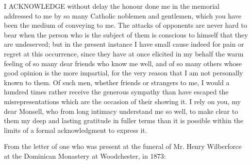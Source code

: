I ACKNOWLEDGE without delay
the honour done me in the memorial addressed to me by so many Catholic
noblemen and gentlemen, which you have been the medium of conveying to
me. The attacks of opponents are never hard to bear when the person
who is the subject of them is conscious to himself that they are
undeserved; but in the present instance I have small cause indeed for
pain or regret at this occurrence, since they have at once elicited in
my behalf the warm feeling of so many dear friends who know me well,
and of so many others whose good opinion is the more impartial, for
the very reason that I am not personally known to them. Of such men,
whether friends or strangers to me, I would a hundred times rather
receive the generous sympathy than have escaped the misrepresentations
which are the occasion of their showing it. I rely on you, my dear
Monsell, who from long intimacy understand me so well, to make clear
to them my deep and lasting gratitude in fuller terms than it is
possible within the limits of a formal acknowledgment to express it.


From the letter of one who was present at the
funeral of Mr. Henry Wilberforce at the Dominican Monastery at
Woodchester, in 1873:


